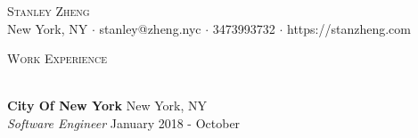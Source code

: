 \documentclass[a4paper]{article}
\newcommand{\lineunder} {
    \vspace*{-8pt} \\
    \hspace*{-18pt} \hrulefill \\
}
\newcommand{\header} [1] {
    {\hspace*{-18pt}\vspace*{6pt} \textsc{#1}}
    \vspace*{-6pt} \lineunder
}
\begin{document}
\vspace*{-40pt}

    

\vspace*{-10pt}
\begin{center}
	{\Huge \scshape {Stanley Zheng}}\\
	New York, NY $\cdot$ stanley@zheng.nyc $\cdot$ 3473993732 $\cdot$ https://stanzheng.com\\
\end{center}

\header{Work Experience}
\vspace{1mm}

\textbf{City Of New York} \hfill New York, NY\\
\textit{Software Engineer} \hfill January 2018 - October\\
\vspace{-1mm}
\begin{itemize} \itemsep 1pt
\end{itemize}
\end{document}

